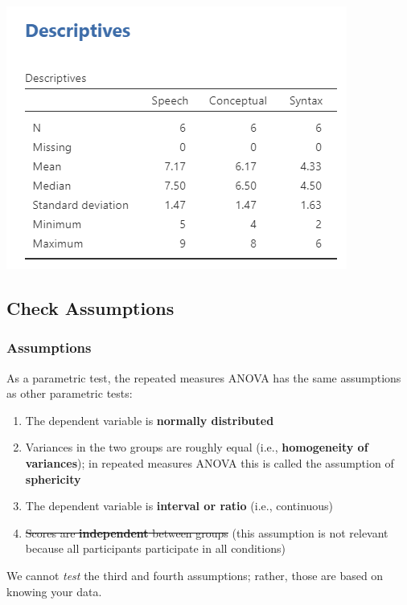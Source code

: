 \documentclass[
]{book}
\begin{document}
\includegraphics{images/05-repeated-measures-anova/rm_descriptives.png}

\hypertarget{check-assumptions-5}{%
\subsection{Check Assumptions}\label{check-assumptions-5}}

\hypertarget{assumptions-4}{%
\subsubsection{Assumptions}\label{assumptions-4}}

As a parametric test, the repeated measures ANOVA has the same assumptions as other parametric tests:

\begin{enumerate}
\def\labelenumi{\arabic{enumi}.}
\item
  The dependent variable is \textbf{normally distributed}
\item
  Variances in the two groups are roughly equal (i.e., \textbf{homogeneity of variances}); in repeated measures ANOVA this is called the assumption of \textbf{sphericity}
\item
  The dependent variable is \textbf{interval or ratio} (i.e., continuous)
\item
  \sout{Scores are \textbf{independent} between groups} (this assumption is not relevant because all participants participate in all conditions)
\end{enumerate}

We cannot \emph{test} the third and fourth assumptions; rather, those are based on knowing your data.
\end{document}
